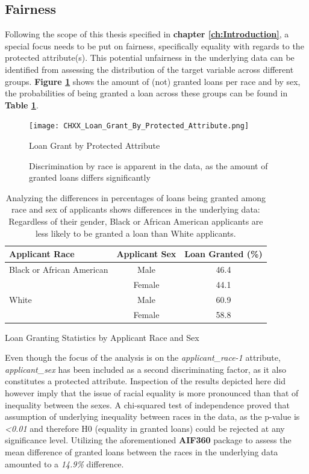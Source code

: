 \subsection{Fairness}\label{subsec:Fairness}

Following the scope of this thesis specified in \textbf{chapter \ref{ch:Introduction}}, a special focus needs to be put  on fairness, specifically equality with regards to the protected attribute(s).
This potential unfairness in the underlying data can be identified from assessing the distribution of the target variable across different groups.
\textbf{Figure \ref{fig:CHXX_Loan_Grant_By_Protected_Attribute}} shows the amount of (not) granted loans per race and by sex, the probabilities of being granted a loan across these groups can be found in \textbf{Table \ref{tab:loan_granting}}.\@

\begin{figure}[h]
    \centering
    \texttt{[image: CHXX\_Loan\_Grant\_By\_Protected\_Attribute.png]}
    \caption{Loan Grant by Protected Attribute}
    \caption*{Discrimination by race is apparent in the data, as the amount of granted loans differs significantly}
    \label{fig:CHXX_Loan_Grant_By_Protected_Attribute}
\end{figure}

\begin{table}[htbp]
    \centering
      \begin{tabular}{lcc}
      \toprule
      \textbf{Applicant Race} & \textbf{Applicant Sex} & \textbf{Loan Granted (\%)} \\
      \midrule
      Black or African American & Male    & 46.4 \\
            & Female  & 44.1 \\
      White & Male    & 60.9 \\
            & Female  & 58.8 \\
      \bottomrule
      \end{tabular}
      \caption{Loan Granting Statistics by Applicant Race and Sex}
      \caption*{Analyzing the differences in percentages of loans being granted among race and sex of applicants shows differences in the underlying data: Regardless of their gender, Black or African American applicants are less likely to be granted a loan than White applicants.}
    \label{tab:loan_granting}%
\end{table}%

Even though the focus of the analysis is on the \textit{applicant\_race-1} attribute, \textit{applicant\_sex} has been included as a second discriminating factor, as it also constitutes a protected attribute.
Inspection of the results depicted here did however imply that the issue of racial equality is more pronounced than that of inequality between the sexes.
A chi-squared test of independence proved that assumption of underlying inequality between races in the data, as the p-value is \textit{<0.01} and therefore H0 (equality in granted loans) could be rejected at any significance level.
Utilizing the aforementioned \textbf{AIF360} package to assess the mean difference of granted loans between the races in the underlying data amounted to a \textit{14.9\%} difference.

